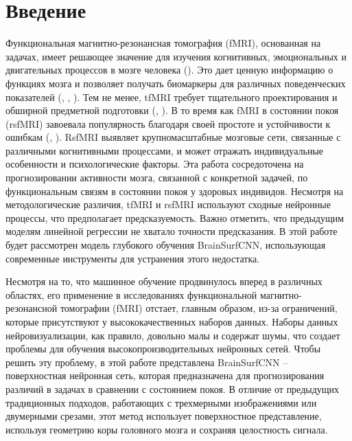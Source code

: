 \section{Введение}

Функциональная магнитно-резонансная томография (fMRI), основанная на задачах, имеет решающее значение для изучения когнитивных, эмоциональных и двигательных процессов в мозге человека (\cite{anticevic2008 comparing, besle2013single, schaefer2018local}).
Это дает ценную информацию о функциях мозга и позволяет получать биомаркеры для различных поведенческих показателей  (\cite{mcnab2008prefrontal}, \cite{risk2007neural}, \cite{nijhof2015simulating}).
Тем не менее, tfMRI требует тщательного проектирования и обширной предметной подготовки (\cite{church2010task}, \cite{rosazza2018pre}).
В то время как fMRI в состоянии покоя (rsfMRI) завоевала популярность благодаря своей простоте и устойчивости к ошибкам (\cite{power2014studying}, \cite{dubois2016building}).
RsfMRI выявляет крупномасштабные мозговые сети, связанные с различными когнитивными процессами, и может отражать индивидуальные особенности и психологические факторы.
Эта работа сосредоточена на прогнозировании активности мозга, связанной с конкретной задачей, по функциональным связям в состоянии покоя у здоровых индивидов.
Несмотря на методологические различия, tfMRI и rsfMRI используют сходные нейронные процессы, что предполагает предсказуемость.
Важно отметить, что предыдущим моделям линейной регрессии не хватало точности предсказания.
В этой работе будет рассмотрен модель глубокого обучения BrainSurfCNN, использующая современные инструменты для устранения этого недостатка.

Несмотря на то, что машинное обучение продвинулось вперед в различных областях, его применение в исследованиях функциональной магнитно-резонансной томографии (fMRI) отстает, главным образом, из-за ограничений, которые присутствуют у высококачественных наборов данных.
Наборы данных нейровизуализации, как правило, довольно малы и содержат шумы, что создает проблемы для обучения высокопроизводительных нейронных сетей.
Чтобы решить эту проблему, в этой работе представлена BrainSurfCNN -- поверхностная нейронная сеть, которая предназначена для прогнозирования различий в задачах в сравнении с состоянием покоя.
В отличие от предыдущих традиционных подходов, работающих с трехмерными изображениями или двумерными срезами, этот метод использует поверхностное представление, используя геометрию коры головного мозга и сохраняя целостность сигнала.